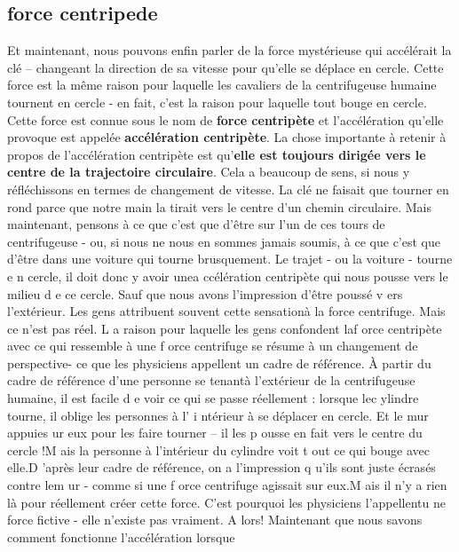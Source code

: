 \documentclass[a4paper, twoside]{article}
\begin{document}
\hypertarget{force-centripede}{%
\subsection{force centripede}\label{force-centripede}}

Et maintenant, nous pouvons enfin parler de la force mystérieuse qui
accélérait la clé -- changeant la direction de sa vitesse pour qu'elle
se déplace en cercle. Cette force est la même raison pour laquelle les
cavaliers de la centrifugeuse humaine tournent en cercle - en fait,
c'est la raison pour laquelle tout bouge en cercle. Cette force est
connue sous le nom de \textbf{force centripète} et l'accélération
qu'elle provoque est appelée \textbf{accélération centripète}. La chose
importante à retenir à propos de l'accélération centripète est
qu'\textbf{elle est toujours dirigée vers le centre de la trajectoire
circulaire}. Cela a beaucoup de sens, si nous y réfléchissons en termes
de changement de vitesse. La clé ne faisait que tourner en rond parce
que notre main la tirait vers le centre d'un chemin circulaire. Mais
maintenant, pensons à ce que c'est que d'être sur l'un de ces tours de
centrifugeuse - ou, si nous ne nous en sommes jamais soumis, à ce que
c'est que d'être dans une voiture qui tourne brusquement. Le trajet - ou
la voiture - tourne e n cercle, il doit donc y avoir unea ccélération
centripète qui nous pousse vers le milieu d e ce cercle. Sauf que nous
avons l'impression d'être poussé v ers l'extérieur. Les gens attribuent
souvent cette sensationà la force centrifuge. Mais ce n'est pas réel. L
a raison pour laquelle les gens confondent laf orce centripète avec ce
qui ressemble à une f orce centrifuge se résume à un changement de
perspective- ce que les physiciens appellent un cadre de référence. À
partir du cadre de référence d'une personne se tenantà l'extérieur de la
centrifugeuse humaine, il est facile d e voir ce qui se passe réellement
: lorsque lec ylindre tourne, il oblige les personnes à l' i ntérieur à
se déplacer en cercle. Et le mur appuies ur eux pour les faire tourner
-- il les p ousse en fait vers le centre du cercle !M ais la personne à
l'intérieur du cylindre voit t out ce qui bouge avec elle.D 'après leur
cadre de référence, on a l'impression q u'ils sont juste écrasés contre
lem ur - comme si une f orce centrifuge agissait sur eux.M ais il n'y a
rien là pour réellement créer cette force. C'est pourquoi les physiciens
l'appellentu ne force fictive - elle n'existe pas vraiment. A lors!
Maintenant que nous savons comment fonctionne l'accélération lorsque
\end{document}
